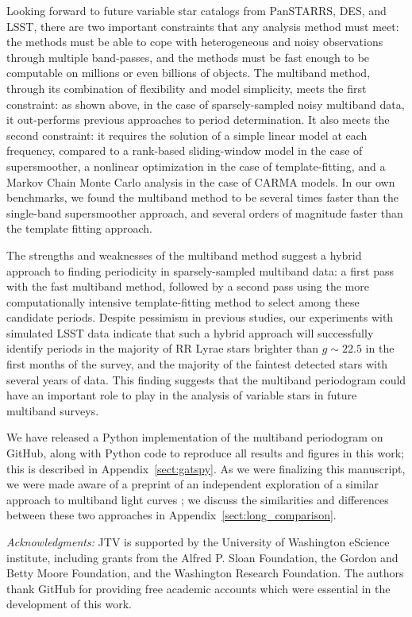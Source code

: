\documentclass{emulateapj}
\newcommand{\App}[1]{Appendix~\ref{sect:#1}}
\newcommand{\app}[1]{\App{#1}}
\begin{document}
Looking forward to future variable star catalogs from PanSTARRS, DES, and LSST, there are two important constraints that any analysis method must meet: the methods must be able to cope with heterogeneous and noisy observations through multiple band-passes, and the methods must be fast enough to be computable on millions or even billions of objects.
The multiband method, through its combination of flexibility and model simplicity, meets the first constraint: as shown above, in the case of sparsely-sampled noisy multiband data, it out-performs previous approaches to period determination.
It also meets the second constraint: it requires the solution of a simple linear model at each frequency, compared to a rank-based sliding-window model in the case of supersmoother, a nonlinear optimization in the case of template-fitting, and a Markov Chain Monte Carlo analysis in the case of CARMA models.
In our own benchmarks, we found the multiband method to be several times faster than the single-band supersmoother approach, and several orders of magnitude faster than the template fitting approach.

The strengths and weaknesses of the multiband method suggest a hybrid approach to finding periodicity in sparsely-sampled multiband data: a first pass with the fast multiband method, followed by a second pass using the more computationally intensive template-fitting method to select among these candidate periods.
Despite pessimism in previous studies, our experiments with simulated LSST data indicate that such a hybrid approach will successfully identify periods in the majority of RR Lyrae stars brighter than $g\sim 22.5$ in the first months of the survey, and the majority of the faintest detected stars with several years of data.
This finding suggests that the multiband periodogram could have an important role to play in the analysis of variable stars in future multiband surveys.

We have released a Python implementation of the multiband periodogram on GitHub, along with Python code to reproduce all results and figures in this work; this is described in \app{gatspy}.
As we were finalizing this manuscript, we were made aware of a preprint of an independent exploration of a similar approach to multiband light curves \citep{Long2014}; we discuss the similarities and differences between these two approaches in \app{long_comparison}.

{\it Acknowledgments:} JTV is supported by the University of Washington eScience institute, including grants from the Alfred P. Sloan Foundation, the Gordon and Betty Moore Foundation, and the Washington Research Foundation. The authors thank GitHub for providing free academic accounts which were essential in the development of this work.
\end{document}
